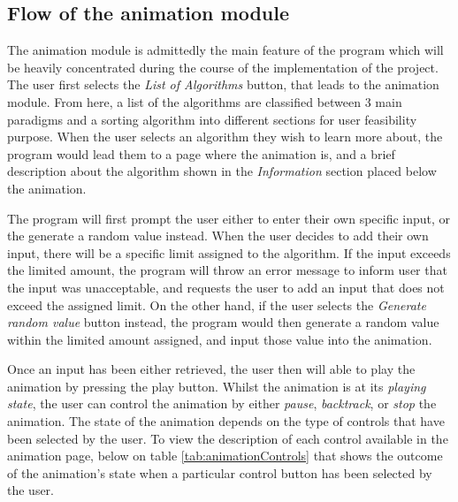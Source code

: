 \subsection{Flow of the animation module} \label{sec:flowchartAnimation}
The animation module is admittedly the main feature of the program which will be heavily concentrated during the course of the implementation of the project. The user first selects the \textit{List of Algorithms} button, that leads to the animation module. From here, a list of the algorithms are classified between 3 main paradigms and a sorting algorithm into different sections for user feasibility purpose. When the user selects an algorithm they wish to learn more about, the program would lead them to a page where the animation is, and a brief description about the algorithm shown in the \textit{Information} section placed below the animation. 

The program will first prompt the user either to enter their own specific input, or the generate a random value instead. When the user decides to add their own input, there will be a specific limit assigned to the algorithm. If the input exceeds the limited amount, the program will throw an error message to inform user that the input was unacceptable, and requests the user to add an input that does not exceed the assigned limit. On the other hand, if the user selects the \textit{Generate random value} button instead, the program would then generate a random value within the limited amount assigned, and input those value into the animation.

Once an input has been either retrieved, the user then will able to play the animation by pressing the play button. Whilst the animation is at its \textit{playing state}, the user can control the animation by either \textit{pause}, \textit{backtrack}, or \textit{stop} the animation. The state of the animation depends on the type of controls that have been selected by the user. To view the description of each control available in the animation page, below on table \ref{tab:animationControls} that shows the outcome of the animation's state when a particular control button has been selected by the user.

